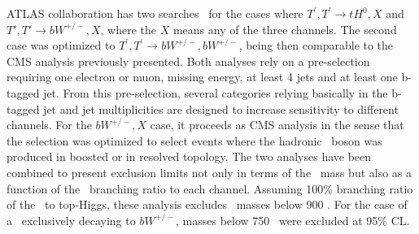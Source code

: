 ATLAS collaboration has two searches~\cite{ATLAS-CONF-2015-012} for the cases where ${T^{'},T^{'}\rightarrow tH^{0},X}$ and ${T',T'\rightarrow bW^{+/-},X}$, where the $X$ means any of the three channels. The second case was optimized to $T^{'},T^{'}\rightarrow bW^{+/-},bW^{+/-}$, being then comparable to the CMS analysis previously presented. Both analyses rely on a pre-selection requiring one electron or muon, missing energy, at least 4 jets and at least one b-tagged jet. From this pre-selection, several categories relying basically in the b-tagged jet and jet multiplicities are designed to increase sensitivity to different channels. For the ${bW^{+/-},X}$ case, it proceeds as CMS analysis in the sense that the selection was optimized to select events where the hadronic \W~boson was produced in boosted or in resolved topology. The two analyses have been combined to present exclusion limits not only in terms of the \Tp~mass but also as a function of the \Tp~branching ratio to each channel. Assuming 100\% branching ratio of the \Tp~to top-Higgs, these analysis excludes \Tp~masses below 900 \GeVcc. For the case of a \Tp~exclusively decaying to $bW^{+/-}$, masses below 750 \GeVcc~were excluded at 95\% CL.

